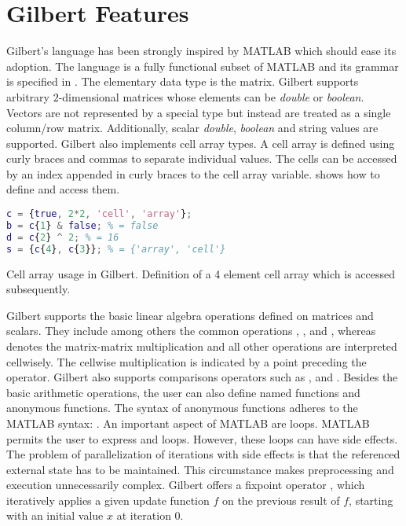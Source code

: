 \section{Gilbert Features}
\label{sec:gilbertFeatures}

Gilbert's language has been strongly inspired by MATLAB which should ease its adoption.
The language is a fully functional subset of MATLAB and its grammar is specified in \cite{Rohrmann2014}.
The elementary data type is the matrix. Gilbert supports arbitrary $2$-dimensional matrices whose elements can be \emph{double} or \emph{boolean}.
Vectors are not represented by a special type but instead are treated as a single column/row matrix.
Additionally, scalar \emph{double}, \emph{boolean} and string values are supported. Gilbert also implements cell array types.
A cell array is defined using curly braces and commas to separate individual values. The cells can be accessed by an index appended in curly braces to the cell array variable.  shows how to define and access them.

\begin{listing}[!h]
  \begin{CenteredBox}
    \begin{lstlisting}[language=Matlab,
        commentstyle=\color{black},
        stringstyle=\color{black},
    ]
c = {true, 2*2, 'cell', 'array'};
b = c{1} & false; % = false
d = c{2} ^ 2; % = 16
s = {c{4}, c{3}}; % = {'array', 'cell'} 
    \end{lstlisting}
  \end{CenteredBox}
  \caption{Cell array usage in Gilbert. Definition of a 4 element cell array which is accessed subsequently.}
  \label{lst:cellArray}
\end{listing}

Gilbert supports the basic linear algebra operations defined on matrices and scalars. They include among others the common operations \code{+}, \code{-}, \code{/} and \code{*}, whereas \code{*} denotes the matrix-matrix multiplication and all other operations are interpreted cellwisely. The cellwise multiplication is indicated by a point preceding the operator. Gilbert also supports comparisons operators such as \code{>}, \code{>=} \code{==} and \code{\textasciitilde=}. Besides the basic arithmetic operations, the user can also define named functions and anonymous functions. The syntax of anonymous functions adheres to the MATLAB syntax: . An important aspect of MATLAB are loops. MATLAB permits the user to express  and  loops. However, these loops can have side effects. The problem of parallelization of iterations with side effects is that the referenced external state has to be maintained. This circumstance makes preprocessing and execution unnecessarily complex. Gilbert offers a fixpoint operator , which iteratively applies a given update function $f$ on the previous result of $f$, starting with an initial value $x$ at iteration $0$.

